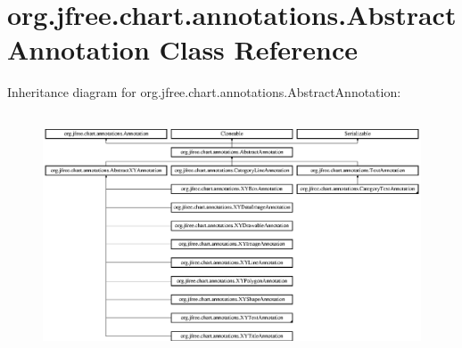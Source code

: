 \hypertarget{classorg_1_1jfree_1_1chart_1_1annotations_1_1_abstract_annotation}{}\section{org.\+jfree.\+chart.\+annotations.\+Abstract\+Annotation Class Reference}
\label{classorg_1_1jfree_1_1chart_1_1annotations_1_1_abstract_annotation}
Inheritance diagram for org.\+jfree.\+chart.\+annotations.\+Abstract\+Annotation\+:\begin{figure}[H]
\begin{center}
\leavevmode
\includegraphics[height=7.202572cm]{classorg_1_1jfree_1_1chart_1_1annotations_1_1_abstract_annotation}
\end{center}
\end{figure}
